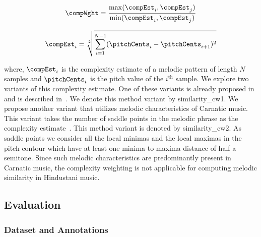 \begin{equation}
\begin{gathered}
\compWght = \frac{\max(\compEst_i,\compEst_j)}{\min(\compEst_i, \compEst_j)} \\
\end{gathered}
\label{eq:complexity_weighing}
\end{equation}

\begin{equation}
\begin{gathered}
\compEst_i = \sqrt[2]{\sum_{i=1}^{N-1} (\pitchCents_{i}-\pitchCents_{i+1})^2}\\
\end{gathered}
\label{eq:complexity_estimate_batista}
\end{equation}

\noindent where, $\compEst_i$ is the complexity estimate of a melodic pattern of length $N$ samples and $\pitchCents_i$ is the pitch value of the $i^{\mathrm{th}}$ sample. We explore two variants of this complexity estimate. One of these variants is already proposed in~\cite{batista2011complexity} and is described in~. We denote this method variant by \acrshort{similarity_cw1}. We propose another variant that utilizes melodic characteristics of Carnatic music. This variant takes the number of saddle points in the melodic phrase as the complexity estimate~\citep{Ishwar2013}. This method variant is denoted by \acrshort{similarity_cw2}. As saddle points we consider all the local minimas and the local maximas in the pitch contour which have at least one minima to maxima distance of half a semitone. Since such melodic characteristics are predominantly present in Carnatic music, the complexity weighting is not applicable for computing melodic similarity in Hindustani music.


\subsection{Evaluation}
\label{sec:patterns_improving_similarity_evaluation}

\subsubsection{Dataset and Annotations}
\label{sec:patterns_improving_similarity_dataset_and_annotations}

